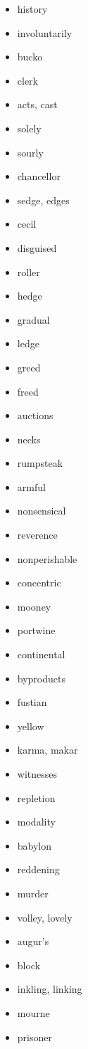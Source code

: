 \documentclass{article}
\begin{document}
\begin{itemize}
    \item history
    \item involuntarily
    \item bucko
    \item clerk
    \item acts, cast
    \item solely
    \item sourly
    \item chancellor
    \item sedge, edges
    \item cecil
    \item disguised
    \item roller
    \item hedge
    \item gradual
    \item ledge
    \item greed
    \item freed
    \item auctions
    \item necks
    \item rumpsteak
    \item armful
    \item nonsensical
    \item reverence
    \item nonperishable
    \item concentric
    \item mooney
    \item portwine
    \item continental
    \item byproducts
    \item fustian
    \item yellow
    \item karma, makar
    \item witnesses
    \item repletion
    \item modality
    \item babylon
    \item reddening
    \item murder
    \item volley, lovely
    \item augur's
    \item block
    \item inkling, linking
    \item mourne
    \item prisoner

\end{itemize}
\end{document}
